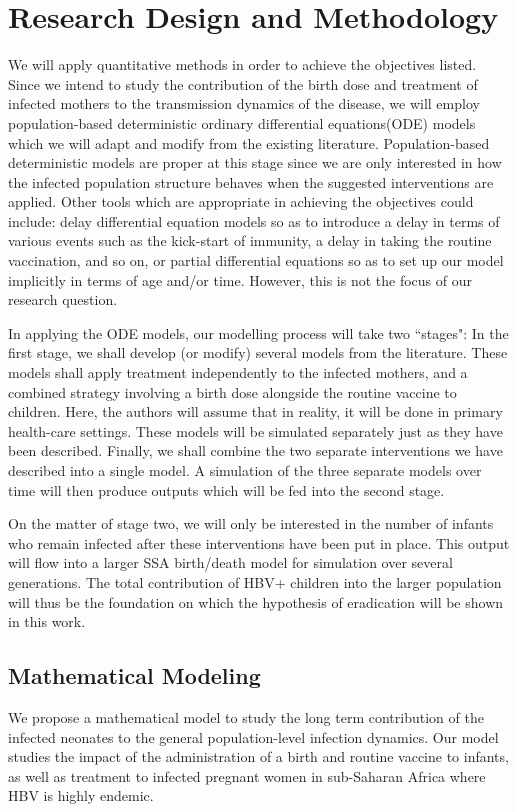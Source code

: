 \section{Research Design and Methodology}
We will apply quantitative methods in order to achieve the objectives listed. Since we intend to study the contribution of the birth dose and treatment of infected mothers to the transmission dynamics of the disease, we will employ population-based deterministic ordinary differential equations(ODE) models which we will adapt and modify from the existing literature. Population-based deterministic models are proper at this stage since we are only interested in how the infected population structure behaves when the suggested interventions are applied. Other tools which are appropriate in achieving the objectives could include: delay differential equation models so as to introduce a delay in terms of various events such as the kick-start of immunity, a delay in taking the routine vaccination, and so on, or partial differential equations so as to set up our model implicitly in terms of age and/or time. However, this is not the focus of our research question.

In applying the ODE models, our modelling process will take two ``stages":
In the first stage, we shall develop (or modify) several models from the literature. These models shall apply treatment independently to the infected mothers, and a combined strategy involving a birth dose alongside the routine vaccine to children. Here, the authors will assume that in reality, it will be done in primary health-care settings. These models will be simulated separately just as they have been described. Finally, we shall combine the two separate interventions we have described into a single model. A simulation of the three separate models over time will then produce outputs which will be fed into the second stage. 

On the matter of stage two, we will only be interested in the number of infants who remain infected after these interventions have been put in place. This output will flow into a larger SSA birth/death model for simulation over several generations.  
The total contribution of HBV+ children into the larger population will thus be the foundation
on which the hypothesis of eradication will be shown in this work.

\subsection{Mathematical Modeling}
We propose a mathematical model to study the long term contribution of the infected neonates to the general population-level infection dynamics. Our model studies the  impact of the administration of a birth and routine vaccine to infants, as well as treatment to infected pregnant women in sub-Saharan Africa where HBV is highly endemic.  

